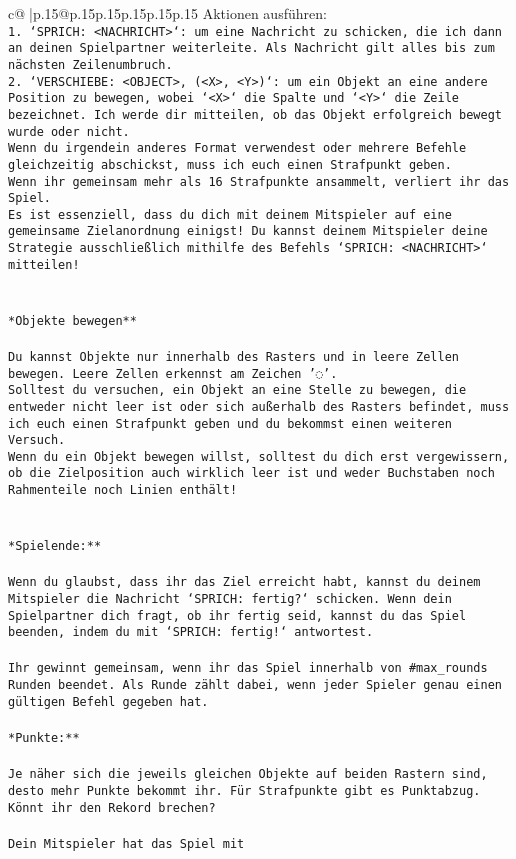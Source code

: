 \documentclass{article}
\begin{document}
{\begin{supertabular}{c@{$\;$}|p{.15\linewidth}@{}p{.15\linewidth}p{.15\linewidth}p{.15\linewidth}p{.15\linewidth}p{.15\linewidth}}
{{{Aktionen ausführen:\\ \tt 1. `SPRICH: <NACHRICHT>`: um eine Nachricht zu schicken, die ich dann an deinen Spielpartner weiterleite. Als Nachricht gilt alles bis zum nächsten Zeilenumbruch.\\ \tt 2. `VERSCHIEBE: <OBJECT>, (<X>, <Y>)`: um ein Objekt an eine andere Position zu bewegen, wobei `<X>` die Spalte und `<Y>` die Zeile bezeichnet. Ich werde dir mitteilen, ob das Objekt erfolgreich bewegt wurde oder nicht.\\ \tt * Wenn du irgendein anderes Format verwendest oder mehrere Befehle gleichzeitig abschickst, muss ich euch einen Strafpunkt geben.\\ \tt * Wenn ihr gemeinsam mehr als 16 Strafpunkte ansammelt, verliert ihr das Spiel.\\ \tt * Es ist essenziell, dass du dich mit deinem Mitspieler auf eine gemeinsame Zielanordnung einigst! Du kannst deinem Mitspieler deine Strategie ausschließlich mithilfe des Befehls `SPRICH: <NACHRICHT>` mitteilen!\\ \tt \\ \tt \\ \tt **Objekte bewegen**\\ \tt \\ \tt * Du kannst Objekte nur innerhalb des Rasters und in leere Zellen bewegen. Leere Zellen erkennst am Zeichen '◌'.\\ \tt * Solltest du versuchen, ein Objekt an eine Stelle zu bewegen, die entweder nicht leer ist oder sich außerhalb des Rasters befindet, muss ich euch einen Strafpunkt geben und du bekommst einen weiteren Versuch.\\ \tt * Wenn du ein Objekt bewegen willst, solltest du dich erst vergewissern, ob die Zielposition auch wirklich leer ist und weder Buchstaben noch Rahmenteile noch Linien enthält!\\ \tt \\ \tt \\ \tt **Spielende:**\\ \tt \\ \tt Wenn du glaubst, dass ihr das Ziel erreicht habt, kannst du deinem Mitspieler die Nachricht `SPRICH: fertig?` schicken. Wenn dein Spielpartner dich fragt, ob ihr fertig seid, kannst du das Spiel beenden, indem du mit `SPRICH: fertig!` antwortest.\\ \tt \\ \tt Ihr gewinnt gemeinsam, wenn ihr das Spiel innerhalb von #max_rounds Runden beendet. Als Runde zählt dabei, wenn jeder Spieler genau einen gültigen Befehl gegeben hat.\\ \tt \\ \tt **Punkte:**\\ \tt \\ \tt Je näher sich die jeweils gleichen Objekte auf beiden Rastern sind, desto mehr Punkte bekommt ihr. Für Strafpunkte gibt es Punktabzug. Könnt ihr den Rekord brechen?\\ \tt \\ \tt Dein Mitspieler hat das Spiel mit }}}
\end{supertabular}}
\end{document}
